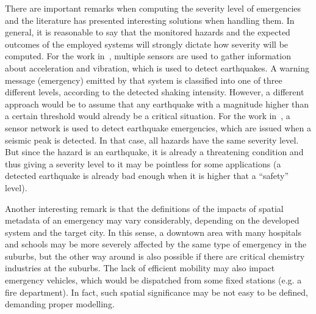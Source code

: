\begin{refsection}
There are important remarks when computing the severity level of emergencies and the literature has presented interesting solutions when handling them. In general, it is reasonable to say that the monitored hazards and the expected outcomes of the employed systems will strongly dictate how severity will be computed. For the work in~\cite{iotEarthquake2}, multiple sensors are used to gather information about acceleration and vibration, which is used to detect earthquakes. A warning message (emergency) emitted by that system is classified into one of three different levels, according to the detected shaking intensity. However, a different approach would be to assume that any earthquake with a magnitude higher than a certain threshold would already be a critical situation. For the work in~\cite{iotEarthquake3}, a sensor network is used to detect earthquake emergencies, which are issued when a seismic peak is detected. In that case, all hazards have the same severity level. But since the hazard is an earthquake, it is already a threatening condition and thus giving a severity level to it may be pointless for some applications (a detected earthquake is already bad enough when it is higher that a ``safety'' level).

Another interesting remark is that the definitions of the impacts of spatial metadata of an emergency may vary considerably, depending on the developed system and the target city. In this sense, a downtown area with many hospitals and schools may be more severely affected by the same type of emergency in the suburbs, but the other way around is also possible if there are critical chemistry industries at the suburbs. The lack of efficient mobility may also impact emergency vehicles, which would be dispatched from some fixed stations (e.g. a fire department). In fact, such spatial significance may be not easy to be defined, demanding proper modelling.


\end{refsection}
